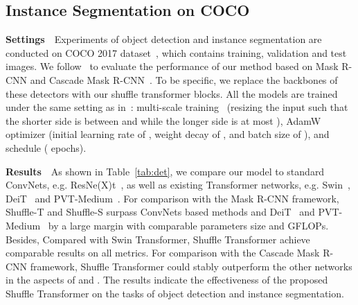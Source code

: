 \documentclass{article}
\begin{document}
\subsection{Instance Segmentation on COCO}
\textbf{Settings}~~Experiments of object detection and instance segmentation are conducted on COCO 2017 dataset~\cite{lin2014microsoft}, which contains  training,  validation and  test images. We follow~\cite{liu2021Swin} to evaluate the performance of our method based on Mask R-CNN and Cascade Mask R-CNN~\cite{he2017mask,cai2018cascade}. To be specific, we replace the backbones of these detectors with our shuffle transformer blocks. All the models are trained under the same setting as in~\cite{liu2021Swin}: multi-scale training~\cite{carion2020end,sun2020sparse} (resizing the input such that the shorter side is between  and  while the longer side is at most ), AdamW~\cite{loshchilov2017decoupled} optimizer (initial learning rate of , weight decay of , and batch size of ), and  schedule ( epochs).

\textbf{Results}~~As shown in Table~\ref{tab:det}, we compare our model to standard ConvNets, e.g. ResNe(X)t~\cite{xie2017aggregated}, as well as existing Transformer networks, e.g. Swin~\cite{liu2021Swin}, DeiT~\cite{touvron2020deit} and PVT-Medium~\cite{wang2021pyramid}. For comparison with the Mask R-CNN framework, Shuffle-T and Shuffle-S surpass ConvNets based methods and DeiT~\cite{touvron2020deit} and PVT-Medium~\cite{wang2021pyramid} by a large margin with comparable parameters size and GFLOPs. Besides, Compared with Swin Transformer, Shuffle Transformer achieve comparable results on all metrics. For comparison with the Cascade Mask R-CNN framework, Shuffle Transformer could stably outperform the other networks in the aspects of  and . The results indicate the effectiveness of the proposed Shuffle Transformer on the tasks of object detection and instance segmentation. 

\begin{table}
\caption{ Ablation study on the effect of spatial shuffle and the neighbor-window connection on two benchmarks, FLOPs is measured on  resolution. }
\label{tab:ab_sps}
\begin{center}
\end{center}
\vspace{-0mm}
\end{table}
\end{document}
